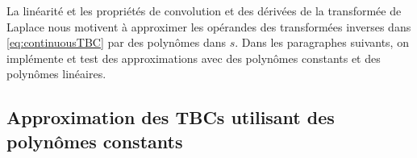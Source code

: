 %
%

\indent La linéarité et les propriétés de convolution et des dérivées de la transformée de Laplace  \cite{laplaceTransform} nous motivent à approximer les opérandes des transformées inverses dans \eqref{eq:continuousTBC} par des polynômes dans $s$. Dans les paragraphes suivants, on implémente et test des approximations avec des polynômes constants et des polynômes linéaires.

\subsection{Approximation des TBCs utilisant des polynômes constants}


